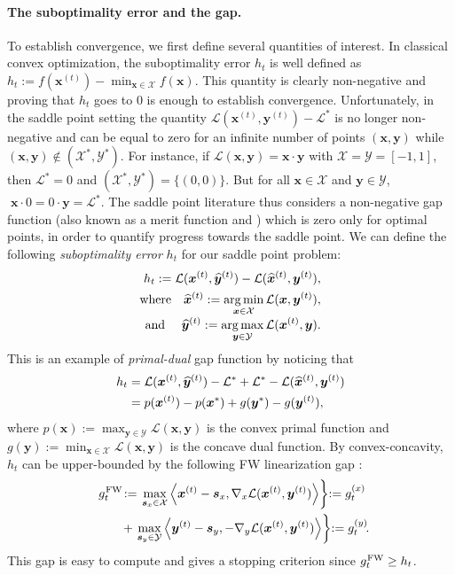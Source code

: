 \documentclass[twoside]{article}
\renewcommand{\L}{\mathcal{L}}
\newcommand{\X}{\mathcal{X}}
\newcommand{\Y}{\mathcal{Y}}
\newcommand{\x}{\bm{x}}
\newcommand{\y}{\bm{y}}
\newcommand{\s}{\bm{s}}
\newcommand{\xt}{\bm{x}^{(t)}}
\newcommand{\yt}{\bm{y}^{(t)}}
\newcommand{\xtm}{\widehat{\bm{x}}^{(t)}}
\newcommand{\ytm}{\widehat{\bm{y}}^{(t)}}
\DeclareMathOperator*{\argmin}{\arg\min}
\DeclareMathOperator*{\argmax}{\arg\max}
\newcommand{\FW}{{\hspace{0.05em}\textnormal{FW}}}
\newcommand{\innerProd}[2]{\left\langle #1 , #2 \right\rangle}
\newcommand{\0}{\mathbf{0}} %
\begin{document}
\paragraph{The suboptimality  error and the gap.} %
\label{par:the_subopti}
To establish convergence, we first define several quantities of interest. 
In classical convex optimization, the suboptimality error $h_t$ is well defined as $h_t := f(\xt)- \min_{\x \in \X} f(\x)$. 
This quantity is clearly non-negative and proving that $h_t$ goes to 0 is enough to establish convergence. 
Unfortunately, in the saddle point setting the quantity $\L(\xt,\yt) - \L^*$ is no longer non-negative and can be equal to zero for an infinite number of points $(\x,\y)$ while $(\x,\y) \notin (\X^*,\Y^*)$. 
For instance, if $\L(\x,\y)=\x \cdot \y$ with $\X = \Y = [-1,1]$, then $\L^* = 0$ and $(\X^*,\Y^*)=\{(0,0)\}$. 
But for all $\x \in \X$ and $\y \in \Y$, $\; \x \cdot 0 = 0 \cdot \y = \L^*$.
The saddle point literature thus considers a non-negative gap function (also known as a merit function \citep{larsson1994class,zhu1998convergence} and \cite[Sec 4.4.1]{patriksson1999nonlinear}) which is zero only for optimal points, in order to quantify progress towards the saddle point. 
We can define the following \emph{suboptimality error} $h_t$ for our saddle point problem:
\vspace{-2mm}
\begin{equation}
\begin{aligned}\label{def:subopt} 
   h_t := \L(\xt,\ytm) - \L(\xtm,\yt), \\
   \text{where} \quad \xtm := \argmin_{\x \in \X} \L(\x,\yt), \\[-1mm]
   \text{and }  \quad \ytm := \argmax_{\y \in \Y} \L(\xt,\y).
\end{aligned}
\vspace{-1mm}
\end{equation}
This is an example of \emph{primal-dual} gap function by noticing that 
\begin{align}
h_t &= \L(\xt,\ytm) -\L^* +\L^* - \L(\xtm,\yt) \notag\\ 
    &= p(\xt) - p(\x^*) + g(\y^*) - g(\yt),  
\end{align}
where $p(\x) := \max_{\y \in \Y} \L(\x,\y)$ is the convex primal function and $g(\y) := \min_{\x \in \X} \L(\x,\y)$ is the concave dual function.
By convex-concavity, $h_t$ can be upper-bounded by the following FW linearization gap 
\citep{jaggi2011sparse,jaggi2013revisiting,larsson1994class,zhu1998convergence}:
\begin{equation}
\begin{aligned}\label{eq:gap}
  \hspace{-2mm} g_t^{\FW}
  & \!:= \left. \max_{\s_x \in \X} \innerProd{\xt- \s_x}{\nabla_x \L(\xt,\yt)} \right\} {\small \!:= g^{(x)}_t}  \\
  & \!+ \left. \max_{\s_y \in \Y} \innerProd{\yt - \s_y}{-\nabla_y \L(\xt,\yt)} \right\} {\small \!:=g^{(y)}_t} \!.
\end{aligned} \hspace{-4mm}
\end{equation}
This gap is easy to compute and gives a stopping criterion since $g_t^{\FW} \geq h_t$.
\end{document}
